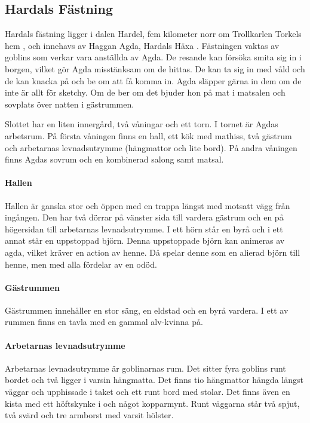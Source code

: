 \subsection{Hardals Fästning}
Hardals fästning ligger i dalen Hardel, fem kilometer norr om Trollkarlen Torkels hem \sectiondescribe{\ref{torkelsStuga}}, och innehavs av Haggan Agda, Hardals Häxa \sectiondescribe{\ref{hagganAgda}}. Fästningen vaktas av goblins som verkar vara anställda av Agda. De resande kan försöka smita sig in i borgen, vilket gör Agda misstänksam om de hittas. De kan ta sig in med våld och de kan knacka på och be om att få komma in. Agda släpper gärna in dem om de inte är allt för sketchy. Om de ber om det bjuder hon på mat i matsalen och sovplats över natten i gästrummen.

Slottet har en liten innergård, två våningar och ett torn. I tornet är Agdas arbetsrum. På första våningen finns en hall, ett kök med mathiss, två gästrum och arbetarnas levnadsutrymme (hängmattor och lite bord). På andra våningen finns Agdas sovrum och en kombinerad salong samt matsal. 

\paragraph{Hallen}
Hallen är ganska stor och öppen med en trappa längst med motsatt vägg från ingången. Den har två dörrar på vänster sida till vardera gästrum och en på högersidan till arbetarnas levnadsutrymme. I ett hörn står en byrå och i ett annat står en uppstoppad björn. Denna uppstoppade björn kan animeras av agda, vilket kräver en action av henne. Då spelar denne som en alierad björn till henne, men med alla fördelar av en odöd.

\paragraph{Gästrummen}
Gästrummen innehåller en stor säng, en eldstad och en byrå vardera. I ett av rummen finns en tavla med en gammal alv-kvinna på. 

\paragraph{Arbetarnas levnadsutrymme}
Arbetarnas levnadsutrymme är goblinarnas rum. Det sitter fyra goblins runt bordet och två ligger i varsin hängmatta. Det finns tio hängmattor hängda längst väggar och upphissade i taket och ett runt bord med stolar. Det finns även en kista med ett höftskynke i och något kopparmynt. Runt väggarna står två spjut, två svärd och tre armborst med varsit hölster.

